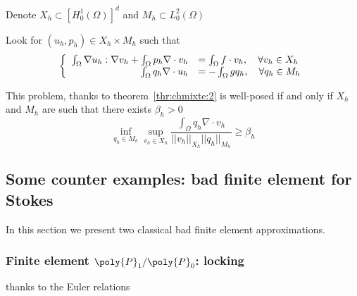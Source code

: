   Denote $X_h \subset [H^1_0(\Omega)]^d$ and $M_h \subset L^2_0(\Omega)$

  \begin{problem}
    \label{prob:chmixte:5}
    Look for $(u_h,p_h) \in X_h \times M_h$ such that
    \begin{equation}
      \label{eq:chmixte:24}
      \left\{
        \begin{array}[c]{rl}
          \int_\Omega \nabla u_h : \nabla v_h + \int_\Omega p_h \nabla \cdot v_h
          & = \int_\Omega f \cdot v_h, \quad \forall v_h \in X_h\\
          \int_\Omega q_h \nabla \cdot u_h & = -\int_\Omega g q_h, \quad \forall q_h \in M_h
        \end{array}
      \right.
    \end{equation}
  \end{problem}
  \begin{remark}
    \label{rem:1}
    This problem, thanks to theorem~\ref{thr:chmixte:2} is well-posed if and only if
    $X_h$ and $M_h$ are such that there exists $\beta_h > 0$
    \begin{equation}
      \label{eq:chmixte:26}
      \inf_{q_h \in M_h} \sup_{v_h \in X_h} \frac{\int_\Omega q_h \nabla \cdot v_h}{||v_h||_{X_h} ||q_h||_{M_h}} \geq \beta_h
    \end{equation}
  \end{remark}

% 

\subsection{Some counter examples: bad finite element for Stokes}
\label{sec:counter-examples}


In this section we present two classical bad finite element approximations.

\subsubsection{Finite element $\poly{P}_1/\poly{P}_0$: locking}
    thanks to the Euler relations


